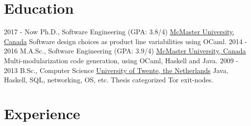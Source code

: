 \documentclass[letterpaper]{twentysecondcv} %
\begin{document}
\makeprofile %



\section{Education}

\begin{twenty} %
  \twentyitem
    {2017 - Now}
    {}
    {Ph.D., Software Engineering \textnormal{(GPA: 3.8/4)}}
    {\href{https://www.mcmaster.ca/}{McMaster University, Canada}}
    {Software design choices as product line variabilities using OCaml.}
    {}
  \twentyitem
    {2014 - 2016}
    {}
    {M.A.Sc., Software Engineering \textnormal{(GPA: 3.9/4)}}
    {\href{https://www.mcmaster.ca/}{McMaster University, Canada}}
    {Multi-modularization code generation, using OCaml, Haskell and Java.}
    {}
  \twentyitem
    {2009 - 2013}
    {}
    {B.Sc., Computer Science}%
    {\href{https://www.utwente.nl/}{University of Twente, the Netherlands}}
    {Java, Haskell, SQL, networking, OS, etc. Thesis categorized Tor exit-nodes.}
    {}
\end{twenty}
\vspace{-.5em}


\section{Experience}
\end{document}
